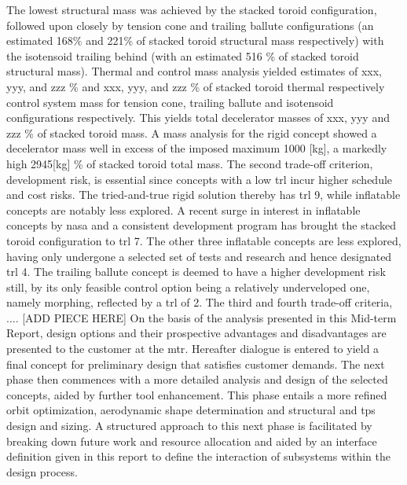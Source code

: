 The lowest structural mass was achieved by the stacked toroid configuration, followed upon closely by tension cone and trailing ballute configurations (an estimated 168\% and 221\% of stacked toroid structural mass respectively) with the isotensoid trailing behind (with an estimated 516 \% of stacked toroid structural mass). Thermal and control mass analysis yielded estimates of xxx, yyy, and zzz \% and xxx, yyy, and zzz \% of stacked toroid thermal respectively control system mass for tension cone, trailing ballute and isotensoid configurations respectively. This yields total decelerator masses of xxx, yyy and zzz \% of stacked toroid mass. A mass analysis for the rigid concept showed a decelerator mass well in excess of the imposed maximum 1000 [kg], a markedly high 2945[kg] \% of stacked toroid total mass.
\newline
\newline
The second trade-off criterion, development risk, is essential since concepts with a low \acrfull{trl} incur higher schedule and cost risks. The tried-and-true rigid solution thereby has \gls{trl} 9, while inflatable concepts are notably less explored. A recent surge in interest in inflatable concepts by \gls{nasa} and a consistent development program has brought the stacked toroid configuration to \gls{trl} 7. The other three inflatable concepts are less explored, having only undergone a selected set of tests and research and hence designated \gls{trl} 4. The trailing ballute concept is deemed to have a higher development risk still, by its only feasible control option being a relatively underveloped one, namely morphing, reflected by a \gls{trl} of 2.
\newline
\newline
The third and fourth trade-off criteria, .... [ADD PIECE HERE]
\newline
\newline
On the basis of the analysis presented in this Mid-term Report, design options and their prospective advantages and disadvantages are presented to the customer at the \gls{mtr}. Hereafter dialogue is entered to yield a final concept for preliminary design that satisfies customer demands. The next phase then commences with a more detailed analysis and design of the selected concepts, aided by further tool enhancement. This phase entails a more refined orbit optimization, aerodynamic shape determination and structural and \gls{tps} design and sizing. A structured approach to this next phase is facilitated by breaking down future work and resource allocation and aided by an interface definition given in this report to define the interaction of subsystems within the design process.